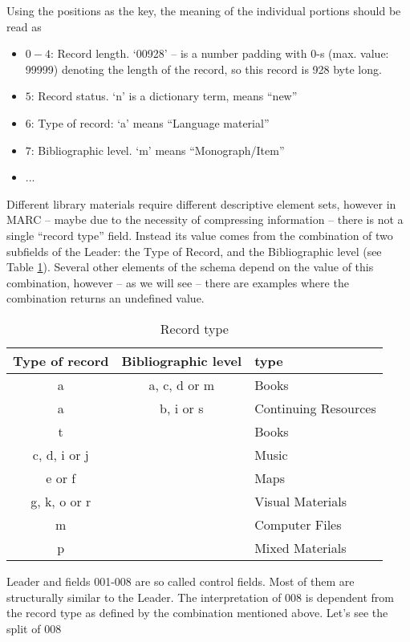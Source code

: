 Using the positions as the key, the meaning of the individual portions should be read as
\begin{itemize}
 \setlength{\parskip}{0pt}
 \setlength{\itemsep}{0pt plus 1pt}
 \item $0-4$: Record length. `00928’ -- is a number padding with 0-s (max. value: 99999) denoting the length of the record, so this record is 928 byte long. 
 \item $5$: Record status. `n’ is a dictionary term, means ``new''
 \item $6$: Type of record: `a’ means ``Language material''
 \item $7$: Bibliographic level. `m’ means ``Monograph/Item''
 \item ...
\end{itemize}

Different library materials require different descriptive element sets, however in MARC -- maybe due to the necessity of compressing information -- there is not a single ``record type'' field. Instead its value comes from the combination of two subfields of the Leader: the Type of Record, and the Bibliographic level (see Table \ref{tab:record_type}). Several other elements of the schema depend on the value of this combination, however -- as we will see -- there are examples where the combination returns an undefined value.

\begin{table}
  \caption{Record type}
  \label{tab:record_type}
  \begin{tabular}{ccl}
    \toprule
    Type of record&Bibliographic level&type\\
    \midrule
    a&a, c, d or m&Books\\
    a&b, i or s&Continuing Resources\\
    t&&Books\\
    c, d, i or j&&Music\\
    e or f&&Maps\\
    g, k, o or r&&Visual Materials\\
    m&&Computer Files\\
    p&&Mixed Materials\\
  \bottomrule
\end{tabular}
\end{table}

Leader and fields 001-008 are so called control fields. Most of them are structurally similar to the Leader. The interpretation of 008 is dependent from the record type as defined by the combination mentioned above. Let's see the split of 008

